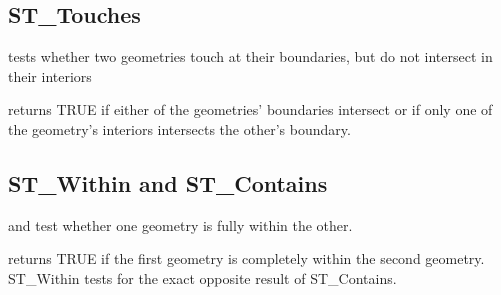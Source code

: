 \documentclass[a4paper,11pt,english]{sphinxmanual}
\begin{document}
\begin{sphinxVerbatim}[commandchars=\\\{\}]
                 
    
\end{sphinxVerbatim}


\subsection{ST\_Touches}
\label{\detokenize{basic:st-touches}}
 tests whether two geometries touch at their boundaries, but do not intersect in their interiors

\begin{figure}[htbp]
\centering

\noindent{}
\end{figure}

 returns TRUE if either of the geometries’ boundaries intersect or if only one of the geometry’s interiors intersects the other’s boundary.


\subsection{ST\_Within and ST\_Contains}
\label{\detokenize{basic:st-within-and-st-contains}}
 and  test whether one geometry is fully within the other.

\begin{figure}[htbp]
\centering

\noindent{}
\end{figure}

 returns TRUE if the first geometry is completely within the second geometry. ST\_Within tests for the exact opposite result of ST\_Contains.
\end{document}
